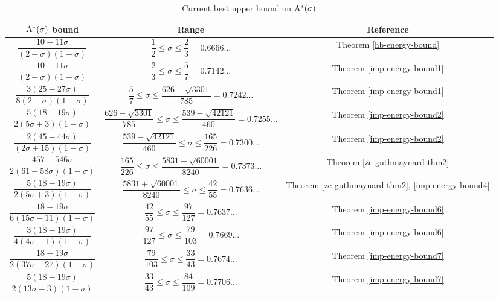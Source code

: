 \begin{table}[ht]
    \def\arraystretch{2}
    \centering
    \caption{Current best upper bound on $\mathrm{A}^*(\sigma)$}
    \begin{tabular}{|c|c|c|}
    \hline
    $\mathrm{A}^*(\sigma)$ bound & Range & Reference\\
    \hline
    $\dfrac{10 - 11\sigma}{(2 - \sigma)(1 - \sigma)}$ & $\dfrac{1}{2} \leq \sigma \le \dfrac{2}{3} = 0.6666\ldots$ & Theorem \ref{hb-energy-bound}\\
    \hline
    $\dfrac{10 - 11\sigma}{(2 - \sigma)(1 - \sigma)}$ & $\dfrac{2}{3} \leq \sigma \le \dfrac{5}{7} = 0.7142\ldots$ & Theorem \ref{imp-energy-bound1}\\
    \hline
    $\dfrac{3(25 - 27\sigma)}{8(2 - \sigma)(1 - \sigma)}$ & $\dfrac{5}{7} \leq \sigma \le \dfrac{626 - \sqrt{3301}}{785} = 0.7242\ldots$ & Theorem \ref{imp-energy-bound1}\\
    \hline
    $\dfrac{5(18 - 19\sigma)}{2(5\sigma + 3)(1 - \sigma)}$ & $\dfrac{626 - \sqrt{3301}}{785} \leq \sigma \le \dfrac{539 - \sqrt{42121}}{460} = 0.7255\ldots$ & Theorem \ref{imp-energy-bound2}\\
    \hline
    $\dfrac{2(45 - 44\sigma)}{(2\sigma + 15)(1 - \sigma)}$ & $\dfrac{539 - \sqrt{42121}}{460} \leq \sigma \le \dfrac{165}{226} = 0.7300\ldots$ & Theorem \ref{imp-energy-bound2}\\
    \hline
    $\dfrac{457 - 546\sigma}{2(61 - 58\sigma)(1-\sigma)}$ & $\dfrac{165}{226} \leq \sigma \le \dfrac{5831 + \sqrt{60001}}{8240} = 0.7373\ldots$ & Theorem \ref{ze-guthmaynard-thm2}\\
    \hline
    $\dfrac{5(18 - 19\sigma)}{2(5\sigma + 3)(1 - \sigma)}$ & $\dfrac{5831 + \sqrt{60001}}{8240} \leq \sigma \le \dfrac{42}{55} = 0.7636\ldots$ & Theorem \ref{ze-guthmaynard-thm2}, \ref{imp-energy-bound4}\\
    \hline
    $\dfrac{18 - 19\sigma}{6(15\sigma - 11)(1- \sigma)}$ & $\dfrac{42}{55} \leq \sigma \le \dfrac{97}{127} = 0.7637\ldots$ & Theorem \ref{imp-energy-bound6}\\
    \hline
    $\dfrac{3(18-19\sigma)}{4(4\sigma-1)(1 - \sigma)}$ & $\dfrac{97}{127} \leq \sigma \le \dfrac{79}{103} = 0.7669\ldots$ & Theorem \ref{imp-energy-bound6}\\
    \hline
    $\dfrac{18 - 19\sigma}{2(37\sigma - 27)(1 - \sigma)}$ & $\dfrac{79}{103} \leq \sigma \le \dfrac{33}{43} = 0.7674\ldots$ & Theorem \ref{imp-energy-bound7}\\
    \hline
    $\dfrac{5(18 - 19\sigma)}{2(13\sigma - 3)(1 - \sigma)}$ & $\dfrac{33}{43} \leq \sigma \le \dfrac{84}{109} = 0.7706\ldots$ & Theorem \ref{imp-energy-bound7}\\

\end{tabular}
\end{table}
